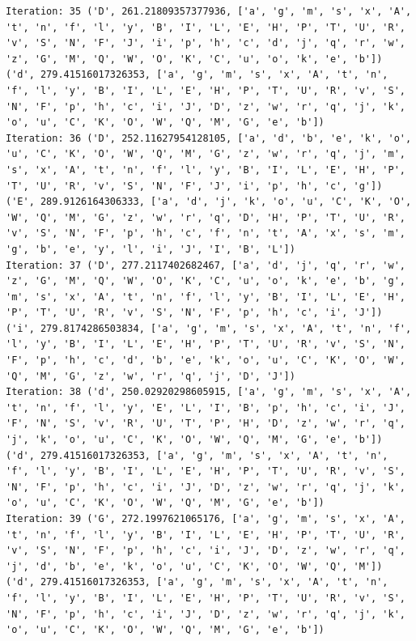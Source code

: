 \documentclass[11pt]{article}
\begin{document}
\begin{lstlisting}
Iteration: 35 ('D', 261.21809357377936, ['a', 'g', 'm', 's', 'x', 'A', 't', 'n', 'f', 'l', 'y', 'B', 'I', 'L', 'E', 'H', 'P', 'T', 'U', 'R', 'v', 'S', 'N', 'F', 'J', 'i', 'p', 'h', 'c', 'd', 'j', 'q', 'r', 'w', 'z', 'G', 'M', 'Q', 'W', 'O', 'K', 'C', 'u', 'o', 'k', 'e', 'b']) ('d', 279.41516017326353, ['a', 'g', 'm', 's', 'x', 'A', 't', 'n', 'f', 'l', 'y', 'B', 'I', 'L', 'E', 'H', 'P', 'T', 'U', 'R', 'v', 'S', 'N', 'F', 'p', 'h', 'c', 'i', 'J', 'D', 'z', 'w', 'r', 'q', 'j', 'k', 'o', 'u', 'C', 'K', 'O', 'W', 'Q', 'M', 'G', 'e', 'b'])
Iteration: 36 ('D', 252.11627954128105, ['a', 'd', 'b', 'e', 'k', 'o', 'u', 'C', 'K', 'O', 'W', 'Q', 'M', 'G', 'z', 'w', 'r', 'q', 'j', 'm', 's', 'x', 'A', 't', 'n', 'f', 'l', 'y', 'B', 'I', 'L', 'E', 'H', 'P', 'T', 'U', 'R', 'v', 'S', 'N', 'F', 'J', 'i', 'p', 'h', 'c', 'g']) ('E', 289.9126164306333, ['a', 'd', 'j', 'k', 'o', 'u', 'C', 'K', 'O', 'W', 'Q', 'M', 'G', 'z', 'w', 'r', 'q', 'D', 'H', 'P', 'T', 'U', 'R', 'v', 'S', 'N', 'F', 'p', 'h', 'c', 'f', 'n', 't', 'A', 'x', 's', 'm', 'g', 'b', 'e', 'y', 'l', 'i', 'J', 'I', 'B', 'L'])
Iteration: 37 ('D', 277.2117402682467, ['a', 'd', 'j', 'q', 'r', 'w', 'z', 'G', 'M', 'Q', 'W', 'O', 'K', 'C', 'u', 'o', 'k', 'e', 'b', 'g', 'm', 's', 'x', 'A', 't', 'n', 'f', 'l', 'y', 'B', 'I', 'L', 'E', 'H', 'P', 'T', 'U', 'R', 'v', 'S', 'N', 'F', 'p', 'h', 'c', 'i', 'J']) ('i', 279.8174286503834, ['a', 'g', 'm', 's', 'x', 'A', 't', 'n', 'f', 'l', 'y', 'B', 'I', 'L', 'E', 'H', 'P', 'T', 'U', 'R', 'v', 'S', 'N', 'F', 'p', 'h', 'c', 'd', 'b', 'e', 'k', 'o', 'u', 'C', 'K', 'O', 'W', 'Q', 'M', 'G', 'z', 'w', 'r', 'q', 'j', 'D', 'J'])
Iteration: 38 ('d', 250.02920298605915, ['a', 'g', 'm', 's', 'x', 'A', 't', 'n', 'f', 'l', 'y', 'E', 'L', 'I', 'B', 'p', 'h', 'c', 'i', 'J', 'F', 'N', 'S', 'v', 'R', 'U', 'T', 'P', 'H', 'D', 'z', 'w', 'r', 'q', 'j', 'k', 'o', 'u', 'C', 'K', 'O', 'W', 'Q', 'M', 'G', 'e', 'b']) ('d', 279.41516017326353, ['a', 'g', 'm', 's', 'x', 'A', 't', 'n', 'f', 'l', 'y', 'B', 'I', 'L', 'E', 'H', 'P', 'T', 'U', 'R', 'v', 'S', 'N', 'F', 'p', 'h', 'c', 'i', 'J', 'D', 'z', 'w', 'r', 'q', 'j', 'k', 'o', 'u', 'C', 'K', 'O', 'W', 'Q', 'M', 'G', 'e', 'b'])
Iteration: 39 ('G', 272.1997621065176, ['a', 'g', 'm', 's', 'x', 'A', 't', 'n', 'f', 'l', 'y', 'B', 'I', 'L', 'E', 'H', 'P', 'T', 'U', 'R', 'v', 'S', 'N', 'F', 'p', 'h', 'c', 'i', 'J', 'D', 'z', 'w', 'r', 'q', 'j', 'd', 'b', 'e', 'k', 'o', 'u', 'C', 'K', 'O', 'W', 'Q', 'M']) ('d', 279.41516017326353, ['a', 'g', 'm', 's', 'x', 'A', 't', 'n', 'f', 'l', 'y', 'B', 'I', 'L', 'E', 'H', 'P', 'T', 'U', 'R', 'v', 'S', 'N', 'F', 'p', 'h', 'c', 'i', 'J', 'D', 'z', 'w', 'r', 'q', 'j', 'k', 'o', 'u', 'C', 'K', 'O', 'W', 'Q', 'M', 'G', 'e', 'b'])

\end{lstlisting}
\end{document}
